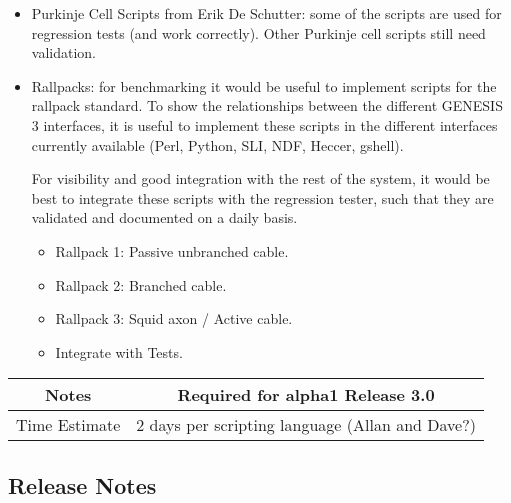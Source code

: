 \documentclass[12pt]{article}
\begin{document}
\begin{itemize}
\item Purkinje Cell Scripts from Erik De Schutter: some of the scripts
  are used for regression tests (and work correctly).  Other Purkinje
  cell scripts still need validation.
\item Rallpacks: for benchmarking it would be useful to implement
  scripts for the rallpack standard.  To show the relationships
  between the different GENESIS 3 interfaces, it is useful to
  implement these scripts in the different interfaces currently
  available (Perl, Python, SLI, NDF, Heccer, gshell).

  For visibility and good integration with the rest of the system, it
  would be best to integrate these scripts with the regression tester,
  such that they are validated and documented on a daily basis.
  \begin{itemize}
  \item Rallpack 1: Passive unbranched cable.
  \item Rallpack 2: Branched cable.
  \item Rallpack 3: Squid axon / Active cable.
  \item Integrate with Tests.
  \end{itemize}
\end{itemize}

{
  \vspace{5mm}
  \centering
  \begin{tabular}{|c|c|}
    \hline
    Notes
    & Required for alpha1 Release 3.0 \\
    \hline
    Time Estimate
    & 2 days per scripting language (Allan and Dave?) \\
    \hline
  \end{tabular}
}


\subsection{Release Notes}
\end{document}
